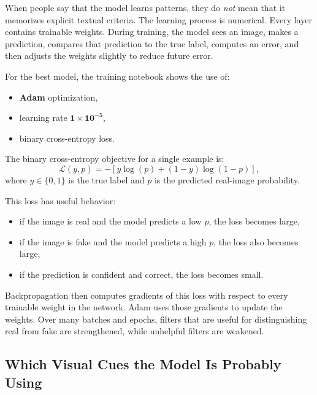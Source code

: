 \documentclass[11pt]{article}
\begin{document}
When people say that the model learns patterns, they do \emph{not} mean that it memorizes explicit textual criteria. The learning process is numerical. Every layer contains trainable weights. During training, the model sees an image, makes a prediction, compares that prediction to the true label, computes an error, and then adjusts the weights slightly to reduce future error.

For the best model, the training notebook shows the use of:
\begin{itemize}[leftmargin=1.5em]
    \item \textbf{Adam} optimization,
    \item learning rate \(\mathbf{1 \times 10^{-5}}\),
    \item binary cross-entropy loss.
\end{itemize}

The binary cross-entropy objective for a single example is:
\[
\mathcal{L}(y,p) = -\left[y \log(p) + (1-y)\log(1-p)\right],
\]
where \(y \in \{0,1\}\) is the true label and \(p\) is the predicted real-image probability.

This loss has useful behavior:
\begin{itemize}[leftmargin=1.5em]
    \item if the image is real and the model predicts a low \(p\), the loss becomes large,
    \item if the image is fake and the model predicts a high \(p\), the loss also becomes large,
    \item if the prediction is confident and correct, the loss becomes small.
\end{itemize}

Backpropagation then computes gradients of this loss with respect to every trainable weight in the network. Adam uses those gradients to update the weights. Over many batches and epochs, filters that are useful for distinguishing real from fake are strengthened, while unhelpful filters are weakened.

\subsection{Which Visual Cues the Model Is Probably Using}
\end{document}
